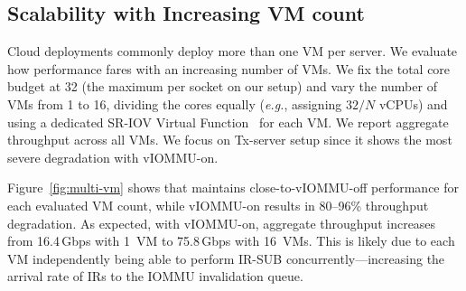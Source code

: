 







\subsection{{\name} Scalability with Increasing VM count}
\label{sec:eval-multi-vm}

Cloud deployments commonly deploy more than one VM per server.
We evaluate how {\name} performance fares with an increasing number of VMs.
We fix the total core budget at 32 (the maximum per socket on our setup) and vary the number of VMs from 1 to 16, dividing the cores equally (\textit{e.g.}, assigning $32/N$ vCPUs) and using a dedicated SR-IOV Virtual Function~\cite{ms_sriov_overview} for each VM.
We report aggregate throughput across all VMs. {We focus on Tx-server setup since it shows the most severe degradation with vIOMMU-on.}


Figure~\ref{fig:multi-vm} shows that {\name} maintains close-to-vIOMMU-off performance for each evaluated VM count,
while vIOMMU-on results in 80--96\% throughput degradation. As expected, with vIOMMU-on, aggregate throughput {increases} from 16.4\,Gbps with 1~VM to 75.8\,Gbps with 16~VMs.
{This is likely due to each VM independently being able to perform IR-SUB concurrently---increasing the arrival rate of IRs to the IOMMU invalidation queue.}

